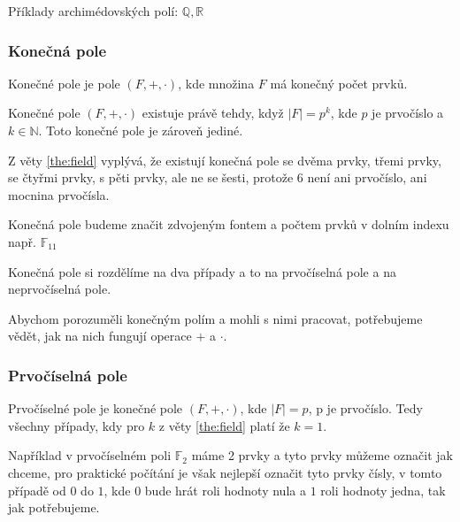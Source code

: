 Příklady archimédovských polí: $\mathbb{Q}, \mathbb{R}$

\subsubsection{Konečná pole}
\begin{definition}
    Konečné pole je pole $(F, +, \cdot)$, kde množina $F$ má konečný počet prvků.
\end{definition}
\begin{theorem}
    \label{the:field}
    Konečné pole $(F, +, \cdot)$ existuje právě tehdy, když $|F| = p^k$, kde $p$ je
    prvočíslo a $k \in \mathbb{N}$. Toto konečné pole je zároveň jediné.
\end{theorem}

Z věty \ref{the:field} vyplývá, že existují konečná pole se dvěma prvky, třemi prvky, se
čtyřmi prvky, s pěti prvky, ale ne se šesti, protože 6 není ani prvočíslo, ani mocnina prvočísla.

Konečná pole budeme značit zdvojeným fontem a počtem prvků v dolním indexu např. $\mathbb{F}_{11}$

Konečná pole si rozdělíme na dva případy a to na prvočíselná pole a na neprvočíselná pole.

Abychom porozuměli konečným polím a mohli s nimi pracovat, potřebujeme vědět,
jak na nich fungují operace $+$ a $\cdot$.

\subsubsection*{Prvočíselná pole}
\begin{definition}
    Prvočíselné pole je konečné pole $(F, +, \cdot)$, kde $|F| = p$, p je prvočíslo. Tedy
    všechny případy, kdy pro $k$ z věty \ref{the:field} platí že $k=1$.
\end{definition}

Například v prvočíselném poli $\mathbb{F}_{2}$
máme 2 prvky a tyto prvky můžeme označit jak chceme, pro praktické počítání je však nejlepší
označit tyto prvky čísly, v tomto případě od $0$ do $1$, kde $0$ bude hrát roli hodnoty nula a
$1$ roli hodnoty jedna, tak jak potřebujeme.

